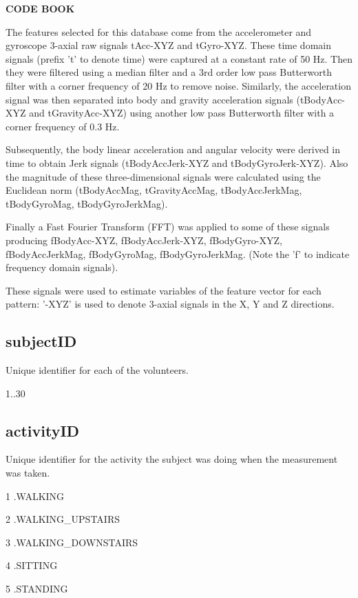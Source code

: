 \documentclass[a4paper,10pt]{report}
\begin{document}
\begin{center}
  \textbf*{CODE BOOK} 
\end{center}

The features selected for this database come from the accelerometer and gyroscope 3-axial raw signals tAcc-XYZ and tGyro-XYZ. These time domain signals (prefix 't' to denote time) were captured at a constant rate of 50 Hz. Then they were filtered using a median filter and a 3rd order low pass Butterworth filter with a corner frequency of 20 Hz to remove noise. Similarly, the acceleration signal was then separated into body and gravity acceleration signals (tBodyAcc-XYZ and tGravityAcc-XYZ) using another low pass Butterworth filter with a corner frequency of 0.3 Hz. 

Subsequently, the body linear acceleration and angular velocity were derived in time to obtain Jerk signals (tBodyAccJerk-XYZ and tBodyGyroJerk-XYZ). Also the magnitude of these three-dimensional signals were calculated using the Euclidean norm (tBodyAccMag, tGravityAccMag, tBodyAccJerkMag, tBodyGyroMag, tBodyGyroJerkMag). 

Finally a Fast Fourier Transform (FFT) was applied to some of these signals producing fBodyAcc-XYZ, fBodyAccJerk-XYZ, fBodyGyro-XYZ, fBodyAccJerkMag, fBodyGyroMag, fBodyGyroJerkMag. (Note the 'f' to indicate frequency domain signals). 

These signals were used to estimate variables of the feature vector for each pattern:
'-XYZ' is used to denote 3-axial signals in the X, Y and Z directions.
\subsection*{subjectID}

Unique identifier for each of the volunteers.

1..30

\subsection*{activityID}

Unique identifier for the activity the subject was doing when the measurement was taken.

   1 .WALKING

   2 .WALKING\_UPSTAIRS

   3 .WALKING\_DOWNSTAIRS

   4 .SITTING

   5 .STANDING
\end{document}
